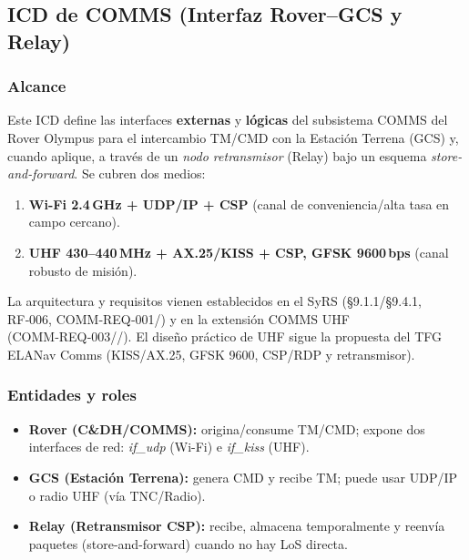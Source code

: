 
\subsection{ICD de COMMS (Interfaz Rover–GCS y Relay)}
\label{sec:icd_comms}

\subsubsection{Alcance}
Este ICD define las interfaces \textbf{externas} y \textbf{lógicas} del subsistema COMMS del Rover Olympus
para el intercambio TM/CMD con la Estación Terrena (GCS) y, cuando aplique, a través de un \emph{nodo
retransmisor} (Relay) bajo un esquema \emph{store-and-forward}. Se cubren dos medios:
\begin{enumerate}
  \item \textbf{Wi-Fi 2.4\,GHz + UDP/IP + CSP} (canal de conveniencia/alta tasa en campo cercano).
  \item \textbf{UHF 430–440\,MHz + AX.25/KISS + CSP, GFSK 9600\,bps} (canal robusto de misión).
\end{enumerate}
\begin{sloppypar}
La arquitectura y requisitos vienen establecidos en el SyRS (§9.1.1/\allowbreak §9.4.1, RF‑006, COMM‑REQ‑001/)
y en la extensión COMMS UHF (COMM‑REQ‑003//). El diseño práctico de UHF sigue la propuesta
del TFG ELANav Comms (KISS/\allowbreak AX.25, GFSK 9600, CSP/\allowbreak RDP y retransmisor).
\end{sloppypar}

\subsubsection{Entidades y roles}
\begin{itemize}
  \item \textbf{Rover (C\&DH/COMMS):} origina/consume TM/CMD; expone dos interfaces de red: \emph{if\_udp} (Wi-Fi) e \emph{if\_kiss} (UHF).
  \item \textbf{GCS (Estación Terrena):} genera CMD y recibe TM; puede usar UDP/IP o radio UHF (vía TNC/Radio).
  \item \textbf{Relay (Retransmisor CSP):} recibe, almacena temporalmente y reenvía paquetes (store-and-forward) cuando no hay LoS directa.
\end{itemize}

